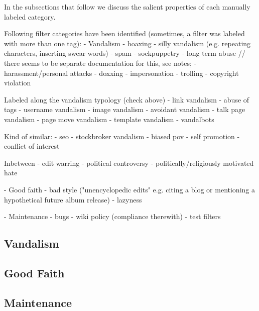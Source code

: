 In the subsections that follow we discuss the salient properties of each manually labeled category.


Following filter categories have been identified (sometimes, a filter was labeled with more than one tag):
- Vandalism
  - hoaxing
  - silly vandalism (e.g. repeating characters, inserting swear words)
  - spam
  - sockpuppetry
  - long term abuse // there seems to be separate documentation for this, see notes;
  - harassment/personal attacks
    - doxxing
    - impersonation
  - trolling
  - copyright violation

  Labeled along the vandalism typology (check above)
  - link vandalism
  - abuse of tags
  - username vandalism
  - image vandalism
  - avoidant vandalism
  - talk page vandalism
  - page move vandalism
  - template vandalism
  - vandalbots

  Kind of similar:
  - seo
  - stockbroker vandalism
  - biased pov
  - self promotion
  - conflict of interest

Inbetween
- edit warring
- political controversy
- politically/religiously motivated hate

- Good faith
  - bad style ("unencyclopedic edits" e.g. citing a blog or mentioning a hypothetical future album release)
  - lazyness


- Maintenance
  - bugs
  - wiki policy (compliance therewith)
  - test filters

\subsection{Vandalism}

\subsection{Good Faith}

\subsection{Maintenance}

